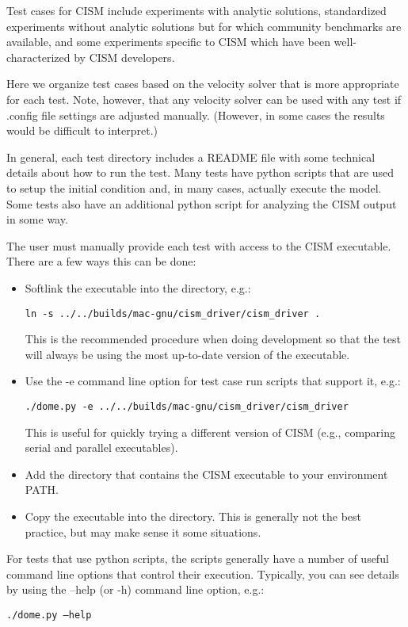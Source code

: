 
\label{ch:tests}

Test cases for CISM include experiments with analytic solutions, standardized experiments
without analytic solutions but for which community benchmarks are available, and
some experiments specific to CISM which have been well-characterized by CISM developers.

Here we organize test cases based on the velocity solver that is more appropriate
for each test.  Note, however, that any velocity solver can be used with any test
if .config file settings are adjusted manually.  (However, in some cases the results
would be difficult to interpret.)

In general, each test directory includes a README file with some technical details 
about how to run the test.  Many tests have python scripts that are used to setup
the initial condition and, in many cases, actually execute the model.  Some tests
also have an additional python script for analyzing the CISM output in some way.

The user must manually provide each test with access to the CISM executable.
There are a few ways this can be done:

\begin{itemize}
  \item Softlink the executable into the directory, e.g.:

        \texttt{ln -s ../../builds/mac-gnu/cism\_driver/cism\_driver .}

        This is the recommended procedure when doing development so that the test
        will always be using the most up-to-date version of the executable.

  \item Use the -e command line option for test case run scripts that support it, e.g.:

        \texttt{./dome.py -e ../../builds/mac-gnu/cism\_driver/cism\_driver}

        This is useful for quickly trying a different version of CISM (e.g., comparing 
        serial and parallel executables).

  \item Add the directory that contains the CISM executable to your environment PATH.

  \item Copy the executable into the directory.  This is generally not the best practice,
        but may make sense it some situations.
\end{itemize}

For tests that use python scripts, the scripts generally have a number of useful
command line options that control their execution.  Typically, you can see details 
by using the --help (or -h) command line option, e.g.:

\texttt{./dome.py --help}







